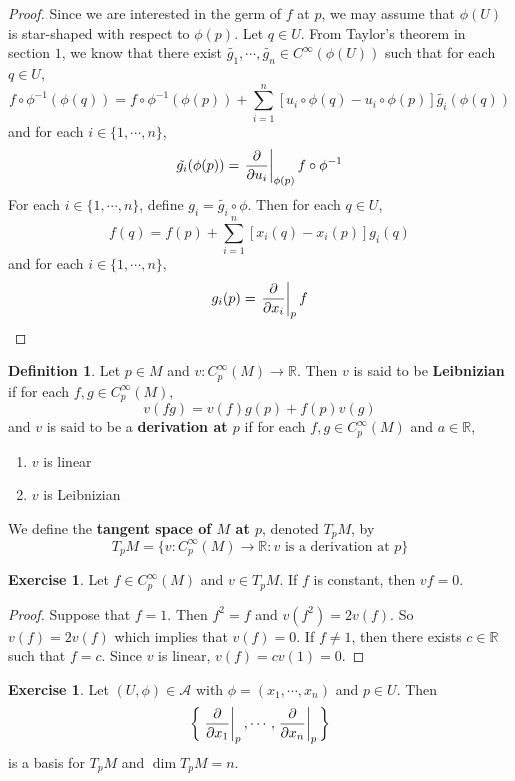 \documentclass[12pt]{amsart}
\theoremstyle{definition}
\newtheorem{defn}[definition]{Definition}
\theoremstyle{definition}
\newtheorem{ex}[definition]{Exercise}
\newcommand{\R}{\mathbb{R}}
\newcommand{\MA}{\mathcal{A}}
\begin{document}
	\begin{proof}
		Since we are interested in the germ of $f$ at $p$, we may assume that $\phi(U)$ is star-shaped with respect to $\phi(p)$. Let $q \in U$. From Taylor's theorem in section $1$, we know that there exist $\tilde{g_1}, \cdots, \tilde{g_n} \in C^{\infty}(\phi(U))$ such that for each $q \in U$, $$f \circ \phi^{-1} (\phi(q)) = f \circ \phi^{-1} (\phi(p)) + \sum_{i = 1}^n [u_i \circ \phi(q) - u_i \circ \phi(p)] \tilde{g_i} (\phi(q))$$ and for each $i \in \{1, \cdots, n\}$, $$\tilde{g_i}(\phi(p)) = \eval{\pdv{u_i}}_{\phi(p)} f \circ \phi^{-1}$$ 
		For each $i \in \{1, \cdots, n\}$, define $g_i = \tilde{g_i} \circ \phi$. Then for each $q \in U$, $$ f (q) = f (p) + \sum_{i = 1}^n [x_i(q) - x_i(p)] g_i(q)$$ and for each $i \in \{1, \cdots, n\}$, $$g_i(p) = \eval{\pdv{x_i}}_{p} f $$ 
	\end{proof}

	\begin{defn}
		Let $p \in M$ and $v: C^{\infty}_p(M) \rightarrow \R$. Then $v$ is said to be \textbf{Leibnizian} if for each $f,g \in  C^{\infty}_p(M)$, $$v(fg) = v(f)g(p) + f(p)v(g)$$ and $v$ is said to be a \textbf{derivation at $p$} if for each $f, g \in C^{\infty}_p(M)$ and $a \in \R$,
		\begin{enumerate}
			\item $v$ is linear 
			\item $v$ is Leibnizian
		\end{enumerate}
		We define the \textbf{tangent space of $M$ at $p$}, denoted $T_pM$, by $$T_pM = \{ v: C^{\infty}_p(M) \rightarrow \R: v \text{ is a derivation at }p\}$$
	\end{defn}

	\begin{ex}
		Let $f \in C^{\infty}_p(M)$ and $v \in T_pM$. If $f$ is constant, then $vf = 0$.
	\end{ex}

	\begin{proof}
		Suppose that $f = 1$. Then $f^2 = f$ and $v(f^2) = 2v(f)$. So $v(f) = 2v(f)$ which implies that $v(f) = 0$. If $f \neq 1$, then there exists $c \in \R$ such that $f = c$. Since $v$ is linear, $v(f) = cv(1) = 0$.
	\end{proof}

	\begin{ex}
		Let $(U, \phi) \in \MA$ with $\phi = (x_1, \cdots, x_n)$ and $p \in U$. Then $$ \bigg \{\eval{\pdv{x_1}}_{p}, \cdots, \eval{\pdv{x_n}}_{p} \bigg \}$$ is a basis for $T_pM$ and $\dim T_pM = n$.
	\end{ex}
\end{document}
